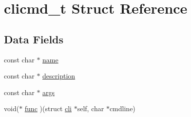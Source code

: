 \hypertarget{structclicmd__t}{\section{clicmd\+\_\+t Struct Reference}
\label{structclicmd__t}
}
\subsection*{Data Fields}
\begin{DoxyCompactItemize}
\item 
const char $\ast$ \hyperlink{structclicmd__t_a787f10043adc684a59031813850935a7}{name}
\item 
const char $\ast$ \hyperlink{structclicmd__t_ae46af4066a493dd85436a03c18f7b46c}{description}
\item 
const char $\ast$ \hyperlink{structclicmd__t_ad2cda88e44f567b4f1a6d2475204a8fa}{args}
\item 
void($\ast$ \hyperlink{structclicmd__t_a2fc41c1a1f4f294b674953d5c7e5edca}{func} )(struct \hyperlink{structcli}{cli} $\ast$self, char $\ast$cmdline)
\end{DoxyCompactItemize}


